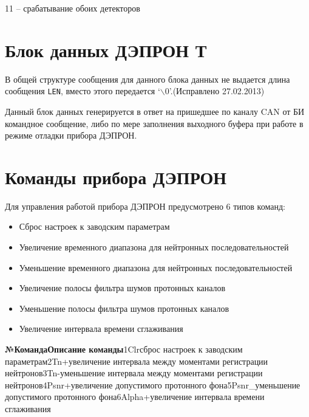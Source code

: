 \begin{flushleft}
	11 -- срабатывание обоих детекторов
\end{flushleft}




\section{Блок данных ДЭПРОН Т}

В общей структуре сообщения для данного блока данных не выдается длина сообщения \texttt{LEN}, вместо этого передается {`}\ensuremath{\backslash}0'.(Исправлено 27.02.2013)


Данный блок данных генерируется в ответ на пришедшее по каналу CAN от БИ командное сообщение, либо по мере заполнения выходного буфера при работе в режиме отладки прибора ДЭПРОН.



\section{Команды прибора ДЭПРОН}



Для управления работой прибора ДЭПРОН предусмотрено 6 типов команд:

\begin{itemize}
	\item 	Сброс настроек к заводским параметрам

	\item Увеличение временного диапазона для нейтронных последовательностей

	\item Уменьшение временного диапазона для нейтронных последовательностей

	\item Увеличение полосы фильтра шумов протонных каналов

	\item Уменьшение полосы фильтра шумов протонных каналов

	\item Увеличение интервала времени сглаживания

\end{itemize}





\textbf{{\small №КомандаОписание команды}}{\small 1Clr}{\small сброс настроек к заводским параметрам2Tn+увеличение интервала между моментами регистрации нейтронов3Tn-уменьшение интервала между моментами регистрации нейтронов4Psnr+увеличение допустимого протонного фона5Psnr\_уменьшение допустимого протонного фона6Alpha+увеличение интервала времени сглаживания}


